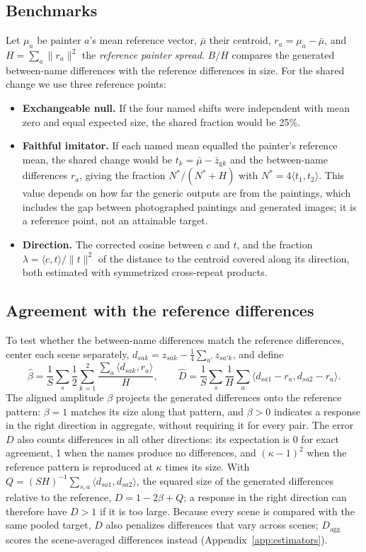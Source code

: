 \documentclass[10pt]{article}
\newcommand{\ip}[2]{\langle #1,#2\rangle}
\begin{document}
\subsection{Benchmarks}

Let $\mu_a$ be painter $a$'s mean reference vector, $\bar\mu$ their centroid,
$r_a=\mu_a-\bar\mu$, and $H=\sum_a\|r_a\|^2$ the \emph{reference painter spread}. $B/H$
compares the generated between-name differences with the reference differences in size. For
the shared change we use three reference points:
\begin{itemize}
\item \textbf{Exchangeable null.} If the four named shifts were independent with mean zero
and equal expected size, the shared fraction would be 25\%.
\item \textbf{Faithful imitator.} If each named mean equalled the painter's reference mean,
the shared change would be $t_k=\bar\mu-\bar z_{\mathrm{g}k}$ and the between-name
differences $r_a$, giving the fraction $N^*/(N^*+H)$ with $N^*=4\ip{t_1}{t_2}$. This value
depends on how far the generic outputs are from the paintings, which includes the gap between
photographed paintings and generated images; it is a reference point, not an attainable
target.
\item \textbf{Direction.} The corrected cosine between $c$ and $t$, and the fraction
$\lambda=\ip{c}{t}/\|t\|^2$ of the distance to the centroid covered along its direction, both
estimated with symmetrized cross-repeat products.
\end{itemize}

\subsection{Agreement with the reference differences}

To test whether the between-name differences match the reference differences, center each
scene separately, $d_{sak}=z_{sak}-\frac14\sum_{a'}z_{sa'k}$, and define
\begin{equation}
\widehat\beta=\frac1S\sum_s\frac{1}{2}\sum_{k=1}^2\frac{\sum_a\ip{d_{sak}}{r_a}}{H},\qquad
\widehat D=\frac1S\sum_s\frac1H\sum_a\ip{d_{sa1}-r_a}{d_{sa2}-r_a}.
\label{eq:beta-d}
\end{equation}
The aligned amplitude $\beta$ projects the generated differences onto the reference pattern:
$\beta=1$ matches its size along that pattern, and $\beta>0$ indicates a response in the right
direction in aggregate, without requiring it for every pair. The error $D$ also counts
differences in all other directions: its expectation is 0 for exact agreement, 1 when the
names produce no differences, and $(\kappa-1)^2$ when the reference pattern is reproduced at
$\kappa$ times its size. With $Q=(SH)^{-1}\sum_{s,a}\ip{d_{sa1}}{d_{sa2}}$, the squared size of
the generated differences relative to the reference, $D=1-2\beta+Q$; a response in the right
direction can therefore have $D>1$ if it is too large. Because every scene is compared with
the same pooled target, $D$ also penalizes differences that vary across scenes;
$D_{\mathrm{agg}}$ scores the scene-averaged differences instead
(Appendix~\ref{app:estimators}).
\end{document}
